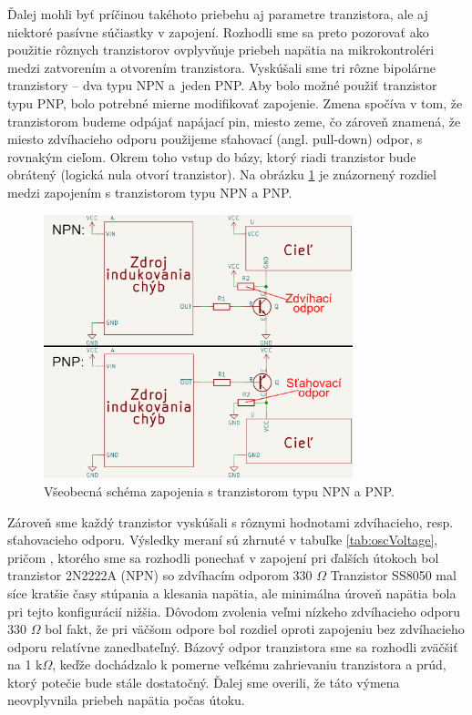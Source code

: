 Ďalej mohli byť príčinou takéhoto priebehu aj parametre tranzistora, ale aj niektoré pasívne súčiastky v zapojení. Rozhodli sme sa preto pozorovať ako použitie rôznych tranzistorov ovplyvňuje priebeh napätia na mikrokontroléri medzi zatvorením a otvorením tranzistora. Vyskúšali sme tri rôzne bipolárne tranzistory -- dva typu NPN a~jeden PNP. Aby bolo možné použiť tranzistor typu PNP, bolo potrebné mierne modifikovať zapojenie. Zmena spočíva v tom, že tranzistorom budeme odpájať napájací pin, miesto zeme, čo zároveň znamená, že miesto zdvíhacieho odporu použijeme sťahovací (angl. pull-down) odpor, s rovnakým cieľom. Okrem toho vstup do bázy, ktorý riadi tranzistor bude obrátený (logická nula otvorí tranzistor). Na obrázku \ref{obr:npnVpnp} je znázornený rozdiel medzi zapojením s tranzistorom typu NPN a PNP.

\begin{figure}
    \centerline{\includegraphics[width=0.8\textwidth]{images/npnVpnp.png}}
    \caption[Všeobecná schéma zapojenia s tranzistorom typu NPN a PNP]{Všeobecná schéma zapojenia s tranzistorom typu NPN a PNP.}
    \label{obr:npnVpnp}
\end{figure}

Zároveň sme každý tranzistor vyskúšali s rôznymi hodnotami zdvíhacieho, resp. sťahovacieho odporu. Výsledky meraní sú zhrnuté v tabuľke \ref{tab:oscVoltage}, pričom , ktorého sme sa rozhodli ponechať v zapojení pri ďalších útokoch bol tranzistor 2N2222A (NPN) so zdvíhacím odporom 330 $\Omega$ Tranzistor SS8050 mal síce kratšie časy stúpania a klesania napätia, ale minimálna úroveň napätia bola pri tejto konfigurácií nižšia. Dôvodom zvolenia veľmi nízkeho zdvíhacieho odporu 330 $\Omega$ bol fakt, že pri väčšom odpore bol rozdiel oproti zapojeniu bez zdvíhacieho odporu relatívne zanedbateľný. Bázový odpor tranzistora sme sa rozhodli zväčšiť na 1 k$\Omega$, keďže dochádzalo k pomerne veľkému zahrievaniu tranzistora a prúd, ktorý potečie bude stále dostatočný. Ďalej sme overili, že táto výmena neovplyvnila priebeh napätia počas útoku.

